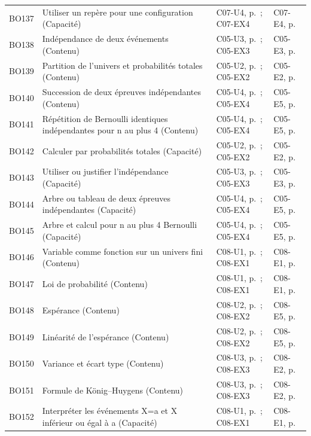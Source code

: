\begin{longtable}{p{.1\linewidth}p{.43\linewidth}p{.19\linewidth}p{.16\linewidth}}
BO137 & Utiliser un repère pour une configuration (Capacité) & C07-U4, p.\,\pageref{C07-U4} ; C07-EX4 & C07-E4, p.\,\pageref{C07-E4} \\
BO138 & Indépendance de deux événements (Contenu) & C05-U3, p.\,\pageref{C05-U3} ; C05-EX3 & C05-E3, p.\,\pageref{C05-E3} \\
BO139 & Partition de l’univers et probabilités totales (Contenu) & C05-U2, p.\,\pageref{C05-U2} ; C05-EX2 & C05-E2, p.\,\pageref{C05-E2} \\
BO140 & Succession de deux épreuves indépendantes (Contenu) & C05-U4, p.\,\pageref{C05-U4} ; C05-EX4 & C05-E5, p.\,\pageref{C05-E5} \\
BO141 & Répétition de Bernoulli identiques indépendantes pour n au plus 4 (Contenu) & C05-U4, p.\,\pageref{C05-U4} ; C05-EX4 & C05-E5, p.\,\pageref{C05-E5} \\
BO142 & Calculer par probabilités totales (Capacité) & C05-U2, p.\,\pageref{C05-U2} ; C05-EX2 & C05-E2, p.\,\pageref{C05-E2} \\
BO143 & Utiliser ou justifier l’indépendance (Capacité) & C05-U3, p.\,\pageref{C05-U3} ; C05-EX3 & C05-E3, p.\,\pageref{C05-E3} \\
BO144 & Arbre ou tableau de deux épreuves indépendantes (Capacité) & C05-U4, p.\,\pageref{C05-U4} ; C05-EX4 & C05-E5, p.\,\pageref{C05-E5} \\
BO145 & Arbre et calcul pour n au plus 4 Bernoulli (Capacité) & C05-U4, p.\,\pageref{C05-U4} ; C05-EX4 & C05-E5, p.\,\pageref{C05-E5} \\
BO146 & Variable comme fonction sur un univers fini (Contenu) & C08-U1, p.\,\pageref{C08-U1} ; C08-EX1 & C08-E1, p.\,\pageref{C08-E1} \\
BO147 & Loi de probabilité (Contenu) & C08-U1, p.\,\pageref{C08-U1} ; C08-EX1 & C08-E1, p.\,\pageref{C08-E1} \\
BO148 & Espérance (Contenu) & C08-U2, p.\,\pageref{C08-U2} ; C08-EX2 & C08-E5, p.\,\pageref{C08-E5} \\
BO149 & Linéarité de l’espérance (Contenu) & C08-U2, p.\,\pageref{C08-U2} ; C08-EX2 & C08-E5, p.\,\pageref{C08-E5} \\
BO150 & Variance et écart type (Contenu) & C08-U3, p.\,\pageref{C08-U3} ; C08-EX3 & C08-E2, p.\,\pageref{C08-E2} \\
BO151 & Formule de König–Huygens (Contenu) & C08-U3, p.\,\pageref{C08-U3} ; C08-EX3 & C08-E2, p.\,\pageref{C08-E2} \\
BO152 & Interpréter les événements X=a et X inférieur ou égal à a (Capacité) & C08-U1, p.\,\pageref{C08-U1} ; C08-EX1 & C08-E1, p.\,\pageref{C08-E1} \\

\end{longtable}
